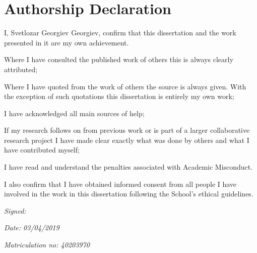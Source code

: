 
\section*{Authorship Declaration}
\vspace{0.5cm}
\begin{flushleft}
I, Svetlozar Georgiev Georgiev, confirm that this dissertation and the work presented in it are my own achievement.\newline

Where I have consulted the published work of others this is always clearly attributed;\newline

Where I have quoted from the work of others the source is always given. With the exception of such quotations this dissertation is entirely my own work;\newline

I have acknowledged all main sources of help; \newline

If my research follows on from previous work or is part of a larger collaborative research project I have made clear exactly what was done by others and what I have contributed myself;\newline

I have read and understand the penalties associated with Academic Misconduct.\newline

I also confirm that I have obtained informed consent from all people I have involved in the work in this dissertation following the School's ethical guidelines.\newline
\end{flushleft}

\begin{flushleft} \large
\emph{Signed:} \\
\end{flushleft}

\vspace{.5cm}

\begin{flushleft} \large
\emph{Date: 03/04/2019} \\
\end{flushleft}

\vspace{.5cm}

\begin{flushleft} \large
\emph{Matriculation no: 40203970}  \\
\end{flushleft}